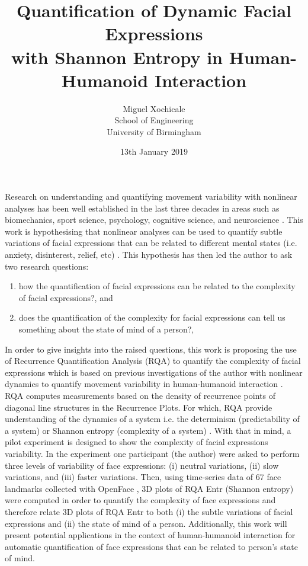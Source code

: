 \documentclass[12pt]{article}
\title{
Quantification of Dynamic Facial Expressions \\
with Shannon Entropy
in Human-Humanoid Interaction
}
\author{Miguel Xochicale \\
School of Engineering \\
University of Birmingham}
\date{13th January 2019}
\begin{document}
\maketitle
\thispagestyle{empty} %

Research on understanding and quantifying movement variability 
with nonlinear analyses has been well established in the last three 
decades in areas such as biomechanics, sport science, psychology, 
cognitive science, and neuroscience \cite{davids2003}.
This work is hypothesising that nonlinear analyses 
can be used to quantify subtle variations of facial expressions 
that can be related to different mental states 
(i.e. anxiety, disinterest, relief, etc) \cite{back2014}.
This hypothesis has then led the author to ask two research questions: 
\begin{enumerate}[label=(\roman*)]
\item how the quantification of facial expressions can be related to  
	the complexity of facial expressions?, and 
\item does the quantification of the complexity for facial expressions 
	can tell us something about the state of mind of a person?, 
\end{enumerate}


In order to give insights into the raised questions,
this work is proposing 
the use of Recurrence Quantification Analysis (RQA) 
to quantify the complexity of facial expressions 
which is based on previous investigations of the author 
with nonlinear dynamics to quantify movement variability 
in human-humanoid interaction \cite{XochicalePhDThesis2018}.
RQA computes measurements based on the density of 
recurrence points of diagonal line 
structures in the Recurrence Plots.
For which, RQA provide understanding of the dynamics of a system i.e. 
the determinism (predictability of a system) or 
Shannon entropy (complexity of a system) \cite{marwan2007}.
With that in mind, a pilot experiment is designed 
to show the complexity of facial expressions variability. 
In the experiment one participant (the author) 
were asked to perform 
three levels of variability of face expressions:
(i) neutral variations, (ii) slow variations, and (iii) faster variations.
Then, using time-series data of 67 face landmarks collected 
with OpenFace \cite{baltrusaitis2018}, 3D plots
of RQA Entr (Shannon entropy) were computed in order
to quantify the complexity of face expressions and 
therefore relate 3D plots of RQA Entr 
to both (i) the subtle variations of facial expressions 
and (ii) the state of mind of a person. Additionally,
this work will present potential applications 
in the context of human-humanoid interaction
for automatic quantification of face expressions 
that can be related to person's state of mind. 




\end{document}
